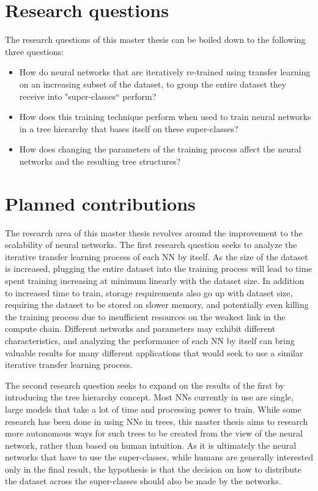 \section{Research questions}\label{research:questions}
The research questions of this master thesis can be boiled down to the following three questions: 

\begin{itemize}
    \item How do neural networks that are iteratively re-trained using transfer learning on an increasing subset of the dataset, to group the entire dataset they receive into "super-classes“ perform? 
    \item How does this training technique perform when used to train neural networks in a tree hierarchy that bases itself on these super-classes?
    \item How does changing the parameters of the training process affect the neural networks and the resulting tree structures?
\end{itemize}{}

\section{Planned contributions}
The research area of this master thesis revolves around the improvement to the scalability of neural networks. 
The first research question seeks to analyze the iterative transfer learning process of each NN by itself. 
As the size of the dataset is increased, plugging the entire dataset into the training process will lead to time spent training increasing at minimum linearly with the dataset size.
In addition to increased time to train, storage requirements also go up with dataset size, requiring the dataset to be stored on slower memory, and potentially even killing the training process due to insufficient resources on the weakest link in the compute chain.
Different networks and parameters may exhibit different characteristics, and analyzing the performance of each NN by itself can bring valuable results for many different applications that would seek to use a similar iterative transfer learning process. 

The second research question seeks to expand on the results of the first by introducing the tree hierarchy concept. 
Most NNs currently in use are single, large models that take a lot of time and processing power to train. 
While some research has been done in using NNs in trees, this master thesis aims to research more autonomous ways for such trees to be created from the view of the neural network, rather than based on human intuition.
As it is ultimately the neural networks that have to use the super-classes, while humans are generally interested only in the final result, the hypothesis is that the decision on how to distribute the dataset across the super-classes should also be made by the networks.

